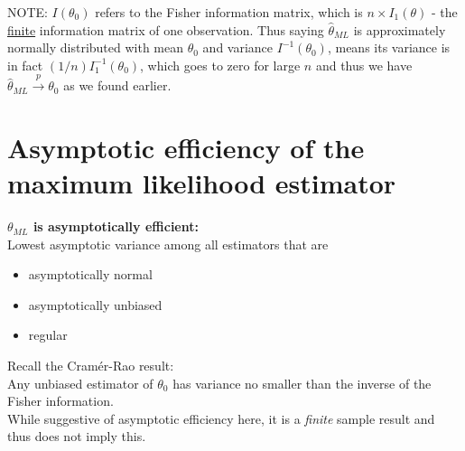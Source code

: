 \documentclass[DIV=14,titlepage=false]{scrreprt}
\begin{document}
NOTE: \(I(\theta_0)\) refers to the \underline{} Fisher information matrix, which is \(n \times I_1(\theta)\) - the \underline{finite} information matrix of one observation.
Thus saying \(\hat{\theta}_{ML}\) is approximately normally distributed with mean \(\theta_0\) and variance \(I^{-1}(\theta_0)\), means its variance is in fact \((1/n)I_1^{-1}(\theta_0)\), which goes to zero for large \(n\) and thus we have \(\hat{\theta}_{ML}\xrightarrow{p}\theta_0\) as we found earlier.

\section{Asymptotic efficiency of the maximum likelihood estimator}

\begin{prop}
    \textbf{\(\theta_{ML}\) is asymptotically efficient:} 
    \\ Lowest asymptotic variance among all estimators that are
    \begin{itemize} 
    \item asymptotically normal
    \item asymptotically unbiased 
    \item regular
    \end{itemize}
\end{prop}
Recall the Cramér-Rao result:
\\Any unbiased estimator of \(\theta_0\) has variance no smaller than the inverse of the Fisher information.
\\While suggestive of asymptotic efficiency here, it is a \textit{finite} sample result and thus does not imply this.
\end{document}
